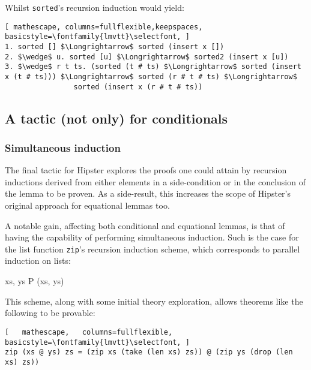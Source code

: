\noindent Whilst \texttt{\selectfont sorted}'s recursion induction would yield:

\begin{lstlisting}[ mathescape, columns=fullflexible,keepspaces, basicstyle=\fontfamily{lmvtt}\selectfont, ]
1. sorted [] $\Longrightarrow$ sorted (insert x [])
2. $\wedge$ u. sorted [u] $\Longrightarrow$ sorted2 (insert x [u])
3. $\wedge$ r t ts. (sorted (t # ts) $\Longrightarrow$ sorted (insert x (t # ts))) $\Longrightarrow$ sorted (r # t # ts) $\Longrightarrow$
                sorted (insert x (r # t # ts))
\end{lstlisting}


\subsection{A tactic (not only) for conditionals}

\subsubsection*{Simultaneous induction}

The final tactic for Hipster explores the proofs one could attain by recursion inductions derived from either elements in a side-condition or in the conclusion of the lemma to be proven.
%
As a side-result, this increases the scope of Hipster's original approach for equational lemmas too.

A notable gain, affecting both conditional and equational lemmas, is that of having the capability of performing simultaneous induction.
%
Such is the case for the list function \texttt{\selectfont zip}'s recursion induction scheme, which corresponds to parallel induction on lists:

  {\forall xs, \; ys \;\; P (xs,\; ys)}

\noindent This scheme, along with some initial theory exploration, allows theorems like the following to be provable:

\begin{lstlisting}[   mathescape,   columns=fullflexible,   basicstyle=\fontfamily{lmvtt}\selectfont, ]
zip (xs @ ys) zs = (zip xs (take (len xs) zs)) @ (zip ys (drop (len xs) zs))
\end{lstlisting}

